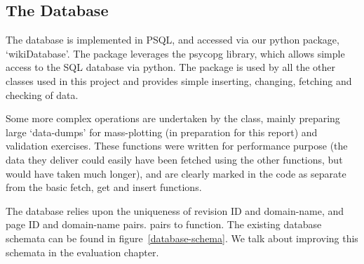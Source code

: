 \subsection*{The Database}
The database is implemented in PSQL, and accessed via our python
package, `wikiDatabase'. The package leverages the psycopg library,
which allows simple access to the SQL database via
python.\cite{psycopg2} The package is used by all the other classes
used in this project and provides simple inserting, changing, fetching
and checking of data.

Some more complex operations are undertaken by the class, mainly
preparing large `data-dumps' for mass-plotting (in preparation for this
report) and validation exercises. These functions were written for
performance purpose (the data they deliver could easily have been
fetched using the other functions, but would have taken much longer),
and are clearly marked in the code as separate from the basic fetch,
get and insert functions. 

The database relies upon the uniqueness of revision ID and
domain-name, and page ID and domain-name pairs.  pairs to
function. The existing database schemata can be found in
figure~\ref{database-schema}. We talk about improving this schemata in
the evaluation chapter.

